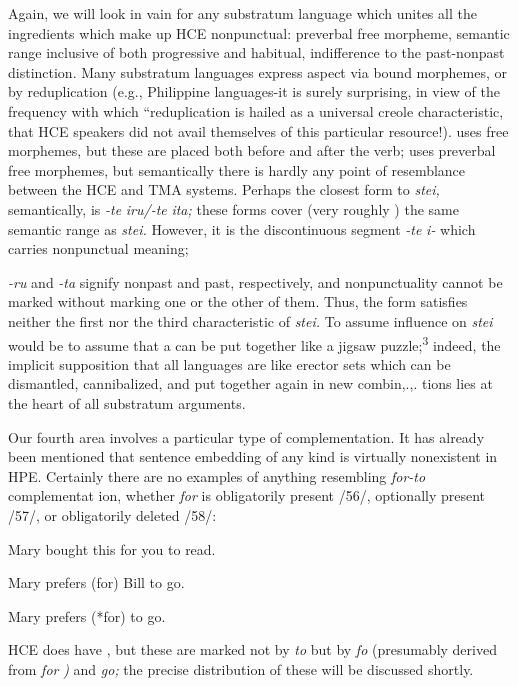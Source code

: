 Again, we will look in vain for any substratum language which unites all the ingredients which make up HCE nonpunctual: preverbal free morpheme, semantic range inclusive of both progressive and habi\-tual, indifference to the past-nonpast distinction. Many substratum languages express aspect via bound morphemes, or by reduplication (e.g., Philippine languages-it is surely surprising, in view of the fre\-quency with which ``reduplication is hailed as a universal creole characteristic, that HCE speakers did not avail themselves of this particular resource!).  uses free morphemes, but these are placed both before and after the verb;  uses preverbal free morphemes, but semantically there is hardly any point of resemblance between the HCE and  TMA systems. Perhaps the closest form to \textit{stei,} semantically, is  \textit{{}-te} \textit{iru/-te} \textit{ita;} these forms cover (very roughly ) the same semantic range as \textit{stei.} However, it is the discontinuous segment \textit{{}-te }\textit{i- }which carries nonpunctual meaning;

\textit{{}-ru} and \textit{{}-ta} signify nonpast and past, respectively, and nonpunctuality cannot be marked without marking one or the other of them. Thus, the  form satisfies neither the first nor the third characteristic of \textit{stei.} To assume  influence on \textit{stei} would be to assume that a  can be put together like a jigsaw puzzle;\textsuperscript{3} indeed, the implicit supposition that all languages are like erector sets which can be dismantled, cannibalized, and put together again in new combin,.,. tions lies at the heart of all substratum arguments.

Our fourth area involves a particular type of  comple\-mentation. It has already been mentioned that sentence embedding of any kind is virtually nonexistent in HPE. Certainly there are no examples of anything resembling  \textit{for-to }complementat ion,
whether \textit{for} is obligatorily present /56/, optionally present /57/, or obligatorily deleted /58/:

\ea\label{ex:56}
 Mary bought this for you to read.
\glt
\z

\ea\label{ex:57}
 Mary prefers (for) Bill to go.
\glt
\z

\ea\label{ex:58}
 Mary prefers (*for) to go.
\glt
\z

HCE does have  , but these are marked not by \textit{to} but by \textit{fo} (presumably derived from  \textit{for} \textit{)} and \textit{go;} the precise distribution of these will be discussed shortly.

